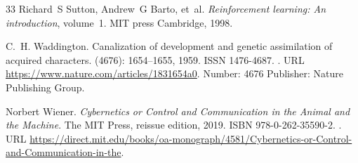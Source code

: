 \documentclass[12pt,fleqn]{article}
\begin{document}
\begin{thebibliography}{33}
  Richard~S Sutton, Andrew~G Barto, et~al.
  \newblock \emph{Reinforcement learning: An introduction}, volume~1.
  \newblock MIT press Cambridge, 1998.

  C.~H. Waddington.
  \newblock Canalization of development and genetic assimilation of acquired
  characters.
   (4676): 1654--1655, 1959.
  \newblock ISSN 1476-4687.
  \newblock {}.
  \newblock URL \url{https://www.nature.com/articles/1831654a0}.
  \newblock Number: 4676 Publisher: Nature Publishing Group.

  Norbert Wiener.
  \newblock \emph{Cybernetics or Control and Communication in the Animal and the
    Machine}.
  \newblock The {MIT} Press, reissue edition, 2019.
  \newblock ISBN 978-0-262-35590-2.
  \newblock {}.
  \newblock URL
  \url{https://direct.mit.edu/books/oa-monograph/4581/Cybernetics-or-Control-and-Communication-in-the}.

\end{thebibliography}
\end{document}
